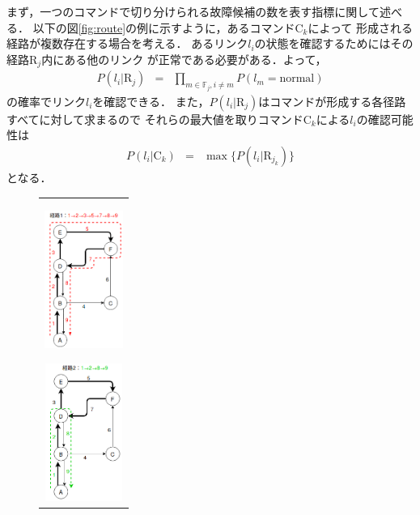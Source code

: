 \documentclass[11pt]{jsarticle}%
\begin{document}
\begin{multicols}{2}
 まず，一つのコマンドで切り分けられる故障候補の数を表す指標に関して述べる．
 以下の図\ref{fig:route}の例に示すように，あるコマンドC$_k$によって
 形成される経路が複数存在する場合を考える．%
 あるリンク$l_i$の状態を確認するためにはその経路$\text{R}_j$内にある他のリンク
 が正常である必要がある．よって，
 \begin{eqnarray}
  P(l_{i} | \text{R}_j) &=& \prod_{m\in\mathbb{F}_j,i\neq m} P(l_{m} = \text{normal})
 \end{eqnarray}
 の確率でリンク$l_i$を確認できる．
 また，$P(l_{i} | \text{R}_j)$はコマンドが形成する各径路すべてに対して求まるので
 それらの最大値を取りコマンドC$_k$による$l_i$の確認可能性は
\begin{eqnarray}
  P(l_i|\text{C}_k) &=& \max  \{ P(l_i|\text{R}_{j_k})\}
\end{eqnarray}
となる．
 \begin{figure}[H]
  \centering
     \begin{tabular}{c}
        \begin{minipage}{0.30\hsize}
        \centering
        \includegraphics[height=4.5cm]{../figure/route1.png}
           \label{fig:route1}
        \end{minipage}
        \begin{minipage}{0.30\hsize}
        \centering
        \includegraphics[height=4.5cm]{../figure/route2.png}

\end{minipage}
\end{tabular}
\end{figure}
\end{multicols}
\end{document}
